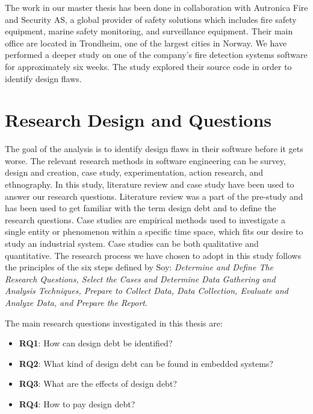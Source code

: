 The work in our master thesis has been done in collaboration with Autronica Fire and Security AS, a global provider of safety solutions which includes fire safety equipment, marine safety monitoring, and surveillance equipment. Their main office are located in Trondheim, one of the largest cities in Norway. We have performed a deeper study on one of the company's fire detection systems software for approximately six weeks. The study explored their source code in order to identify design flaws. 


\section{Research Design and Questions}
\label{sec:chap1designquesitons}
The goal of the analysis is to identify design flaws in their software before it gets worse. The relevant research methods in software engineering can be survey, design and creation, case study, experimentation, action research, and ethnography\cite{Oates:2006:RIS:1202299}. In this study, literature review and case study have been used to answer our research questions. Literature review was a part of the pre-study and has been used to get familiar with the term design debt and to define the research questions. Case studies are empirical methods used to investigate a single entity or phenomenon within a specific time space\cite{Wohlin:2000:ESE:330775}, which fits our desire to study an industrial system. Case studies can be both qualitative and quantitative\cite{bassey2003case,Oates:2006:RIS:1202299}. The research process we have chosen to adopt in this study follows the principles of the six steps defined by Soy\cite{soysusan}: \textit{Determine and Define The Research Questions, Select the Cases and Determine Data Gathering and Analysis Techniques, Prepare to Collect Data, Data Collection, Evaluate and Analyze Data, and Prepare the Report}.

The main research questions investigated in this thesis are:

\begin{itemize}
	\item \textbf{RQ1}: How can design debt be identified?
	\item \textbf{RQ2}: What kind of design debt can be found in embedded systems?
	\item \textbf{RQ3}: What are the effects of design debt?
	\item \textbf{RQ4}: How to pay design debt?
\end{itemize}


